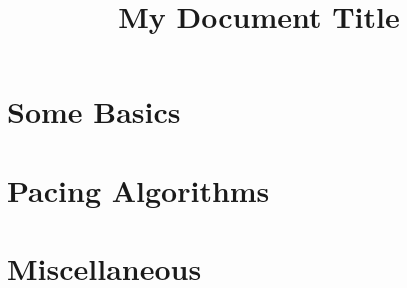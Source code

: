 \documentclass[A4,12pt,twoside]{book}
\title{My Document Title}
\begin{document}
	
	\restoregeometry
	
	
	
	\part{Some Basics} 
	\label{part:some_basics}
	
	
	
	
	
	
	
	\part{Pacing Algorithms}
	\label{part:pacing_algorithms}
	
	
	
	
	
	

	
	\part{Miscellaneous}
	\label{part:misc}
	
	
	
	
	
	
	
	
	
	
	
	
	\printbibliography %

	
	
\end{document}
